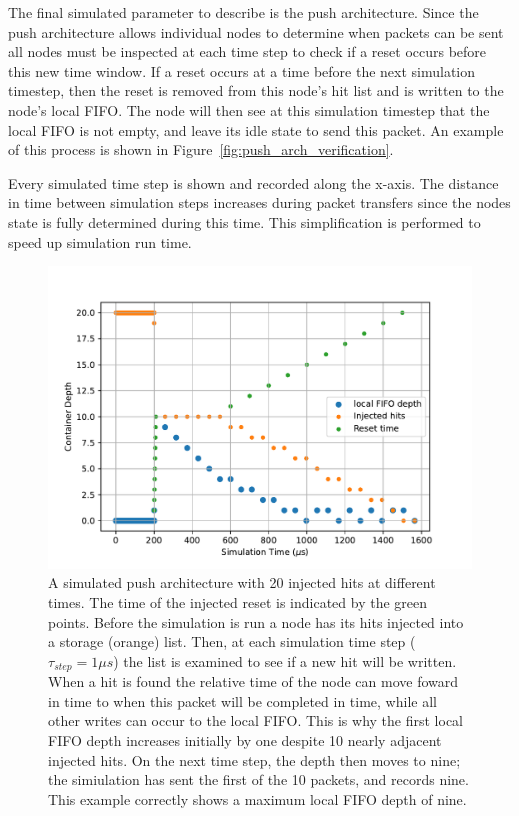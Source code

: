 The final simulated parameter to describe is the push architecture.
Since the push architecture allows individual nodes to determine when packets can be sent all nodes must be inspected at each time step to check if a reset occurs before this new time window.
If a reset occurs at a time before the next simulation timestep, then the reset is removed from this node's hit list and is written to the node's local FIFO.
The node will then see at this simulation timestep that the local FIFO is not empty, and leave its idle state to send this packet.
An example of this process is shown in Figure~\ref{fig:push_arch_verification}.

Every simulated time step is shown and recorded along the x-axis.
The distance in time between simulation steps increases during packet transfers since the nodes state is fully determined during this time.
This simplification is performed to speed up simulation run time.

\begin{figure}[]
\centering
\includegraphics[width=\textwidth]{images/push_arch_buff.pdf}
\caption{A simulated push architecture with 20 injected hits at different times.
The time of the injected reset is indicated by the green points.
Before the simulation is run a node has its hits injected into a storage (orange) list.
Then, at each simulation time step ($\tau_{step}=1\unit{\mu s}$) the list is examined to see if a new hit will be written.
When a hit is found the relative time of the node can move foward in time to when this packet will be completed in time, while all other writes can occur to the local FIFO.
This is why the first local FIFO depth increases initially by one despite 10 nearly adjacent injected hits.
On the next time step, the depth then moves to nine; the simiulation has sent the first of the 10 packets, and records nine.
This example correctly shows a maximum local FIFO depth of nine.
}
\end{figure}~\label{fig:push_arch_verification}